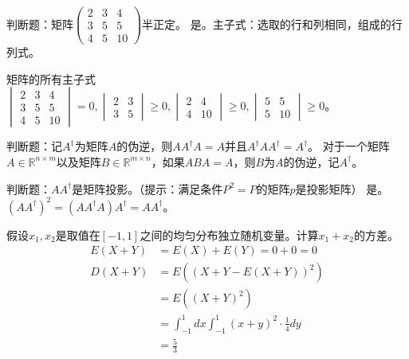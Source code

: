 \begin{problem}
	判断题：矩阵$\begin{pmatrix}
		2&3&4\\3&5&5\\4&5&10
	\end{pmatrix}$半正定。
	\solution 是。主子式：选取的行和列相同，组成的行列式。

	矩阵的所有主子式 $\begin{vmatrix}
		2 & 3 & 4 \\
		3 & 5 & 5 \\
		4 & 5 & 10 
	\end{vmatrix} = 0,\begin{vmatrix}
		2 & 3 \\
		3 & 5
	\end{vmatrix} \ge 0, \begin{vmatrix}
		2 & 4 \\ 
		4 & 10
	\end{vmatrix} \ge 0, \begin{vmatrix}
		5 & 5 \\
		5 & 10
	\end{vmatrix} \ge 0$。
\end{problem}

\begin{problem}[\todo]
	判断题：记$A^{\dagger}$为矩阵$A$的伪逆，则$AA^\dagger A=A$并且$A^\dagger AA^\dagger=A^\dagger$。
	\solution 对于一个矩阵$A\in\mathbb{R}^{n\times m}$以及矩阵$B\in\mathbb{R}^{m\times n}$，如果$ABA=A$，则$B$为$A$的伪逆，记$A^\dagger$。
\end{problem}

\begin{problem}
	判断题：$AA^\dagger$是矩阵投影。（提示：满足条件$P^2=P$的矩阵$p$是投影矩阵）
	\solution 是。$(AA^\dagger)^2 = (AA^\dagger A) A^\dagger = AA^\dagger$。
\end{problem}

\begin{problem}
	假设$x_1,x_2$是取值在$[-1,1]$之间的均匀分布独立随机变量。计算$x_1+x_2$的方差。
	\solution \begin{align*}
		E(X + Y) &= E(X) + E(Y) = 0 + 0 = 0\\
		D(X + Y) &= E((X + Y - E(X + Y))^2)\\
		&=E((X + Y)^2)\\
		&=\int_{-1}^{1}dx \int_{-1}^{1}(x + y)^2 \cdot \frac{1}{4} dy\\
		&=\frac{5}{3}
	\end{align*} 
\end{problem}

